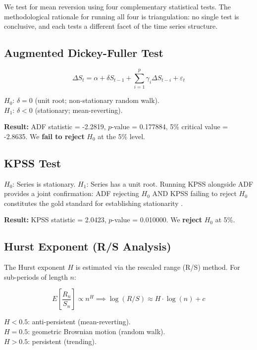 \documentclass[12pt,a4paper]{article}
\begin{document}
We test for mean reversion using four complementary statistical tests.
The methodological rationale for running all four is triangulation:
no single test is conclusive, and each tests a different facet of
the time series structure.

\subsection{Augmented Dickey-Fuller Test}

\begin{equation}
  \Delta S_t = \alpha + \delta S_{t-1} + \sum_{i=1}^{p} \gamma_i \Delta S_{t-i} + \varepsilon_t
\end{equation}

$H_0$: $\delta = 0$ (unit root; non-stationary random walk). \\
$H_1$: $\delta < 0$ (stationary; mean-reverting).

\textbf{Result:} ADF statistic = -2.2819, $p$-value = 0.177884,
5\% critical value = -2.8635.
We \textbf{fail to reject} $H_0$ at the 5\% level.

\subsection{KPSS Test}

$H_0$: Series is stationary. $H_1$: Series has a unit root.
Running KPSS alongside ADF provides a joint confirmation:
ADF rejecting $H_0$ AND KPSS failing to reject $H_0$ constitutes
the gold standard for establishing stationarity
\cite{kwiatkowski1992testing}.

\textbf{Result:} KPSS statistic = 2.0423, $p$-value = 0.010000.
We \textbf{reject} $H_0$ at 5\%.

\subsection{Hurst Exponent (R/S Analysis)}

The Hurst exponent $H$ \cite{mandelbrot1969robustness} is estimated
via the rescaled range (R/S) method. For sub-periods of length $n$:

\begin{equation}
  E\!\left[\frac{R_n}{S_n}\right] \propto n^H
  \implies \log(R/S) \approx H \cdot \log(n) + c
\end{equation}

$H < 0.5$: anti-persistent (mean-reverting). \\
$H = 0.5$: geometric Brownian motion (random walk). \\
$H > 0.5$: persistent (trending).
\end{document}
